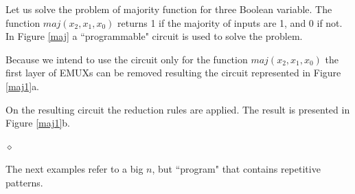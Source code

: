 \begin{exemplu}
Let us solve the problem of majority function for three Boolean
variable. The function $maj(x_{2}, x_{1}, x_{0})$ returns 1 if the
majority of inputs are 1, and 0 if not. In Figure \ref{maj} a
``programmable" circuit is used to solve the problem.

Because we intend to use the circuit only for the function
$maj(x_{2}, x_{1}, x_{0})$ the first layer of EMUXs can be removed
resulting the circuit represented in Figure \ref{maj1}a.




On the resulting circuit the reduction rules are applied. The
result is presented in Figure \ref{maj1}b.

 $\diamond$
\end{exemplu}



The next examples refer to a big $n$, but ``program" that
contains repetitive patterns.

